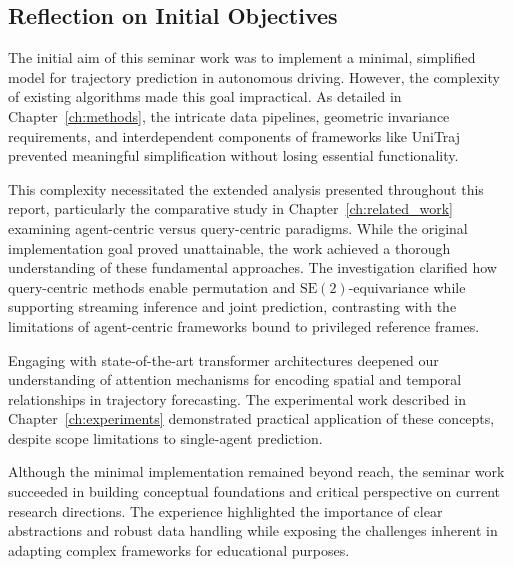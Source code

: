 \subsection{Reflection on Initial Objectives}
\label{sec:conclusion_objectives}

The initial aim of this seminar work was to implement a minimal, simplified model for trajectory prediction in autonomous driving. However, the complexity of existing algorithms made this goal impractical. As detailed in Chapter~\ref{ch:methods}, the intricate data pipelines, geometric invariance requirements, and interdependent components of frameworks like UniTraj prevented meaningful simplification without losing essential functionality.

This complexity necessitated the extended analysis presented throughout this report, particularly the comparative study in Chapter~\ref{ch:related_work} examining agent-centric versus query-centric paradigms. While the original implementation goal proved unattainable, the work achieved a thorough understanding of these fundamental approaches. The investigation clarified how query-centric methods enable permutation and $\mathrm{SE}(2)$-equivariance while supporting streaming inference and joint prediction, contrasting with the limitations of agent-centric frameworks bound to privileged reference frames.

Engaging with state-of-the-art transformer architectures deepened our understanding of attention mechanisms for encoding spatial and temporal relationships in trajectory forecasting. The experimental work described in Chapter~\ref{ch:experiments} demonstrated practical application of these concepts, despite scope limitations to single-agent prediction.

Although the minimal implementation remained beyond reach, the seminar work succeeded in building conceptual foundations and critical perspective on current research directions. The experience highlighted the importance of clear abstractions and robust data handling while exposing the challenges inherent in adapting complex frameworks for educational purposes.
